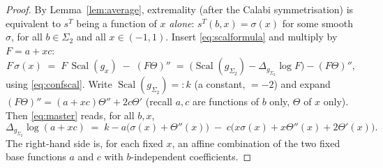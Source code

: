 \documentclass{amsart}
\theoremstyle{definition}
\DeclareMathOperator{\Scal}{Scal}
\begin{document}
\begin{proof}
By Lemma~\ref{lem:average}, extremality (after the Calabi symmetrisation) is
equivalent to $s^T$ being a function of $x$ \emph{alone}: $s^T(b,x)=\sigma(x)$
for some smooth $\sigma$, for all $b\in\Sigma_2$ and all $x\in(-1,1)$. Insert
\eqref{eq:scalformula} and multiply by $F=a+xc$:
\begin{equation}\label{eq:master}
  F\,\sigma(x)\;=\;F\,\Scal(g_x)\;-\;(F\Theta)''
  \;=\;\bigl(\Scal(g_{\Sigma_2})-\Delta_{g_{\Sigma_2}}\log F\bigr)-(F\Theta)'' ,
\end{equation}
using \eqref{eq:confscal}. Write $\Scal(g_{\Sigma_2})=:k$ (a constant, $=-2$)
and expand $(F\Theta)''=(a+xc)\Theta''+2c\Theta'$ (recall $a,c$ are functions of
$b$ only, $\Theta$ of $x$ only). Then \eqref{eq:master} reads, for all $b,x$,
\begin{equation}\label{eq:master2}
  \Delta_{g_{\Sigma_2}}\log(a+xc)
  \;=\; k - a\bigl(\sigma(x)+\Theta''(x)\bigr)
        \;-\; c\bigl(x\sigma(x)+x\Theta''(x)+2\Theta'(x)\bigr).
\end{equation}
The right-hand side is, for each fixed $x$, an affine combination of the two
fixed base functions $a$ and $c$ with $b$-independent coefficients.


\end{proof}
\end{document}
